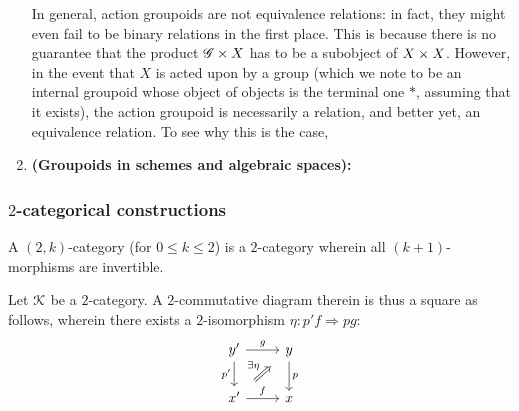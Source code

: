 \begin{example}
\begin{enumerate}
                    In general, action groupoids are not equivalence relations: in fact, they might even fail to be binary relations in the first place. This is because there is no guarantee that the product $\scrG \x X$ has to be a subobject of $X \x X$. However, in the event that $X$ is acted upon by a group (which we note to be an internal groupoid whose object of objects is the terminal one $*$, assuming that it exists), the action groupoid is necessarily a relation, and better yet, an equivalence relation. To see why this is the case, 
                    \item \textbf{(Groupoids in schemes and algebraic spaces):} 
                \end{enumerate}
            \end{example}
        
        \subsubsection{\texorpdfstring{$2$}{}-categorical constructions}
            \begin{definition} \label{def: 2_categories_and_2_functors}
                
            \end{definition}
            \begin{definition}[$(2, k)$-categories] \label{def: (2, k)_categories} 
                A $(2, k)$-category (for $0 \leq k \leq 2$) is a $2$-category wherein all $(k + 1)$-morphisms are invertible.
            \end{definition}
            
            \begin{definition} \label{def: 2_commutative_diagrams}
                Let $\mathcal{K}$ be a $2$-category. A $2$-commutative diagram therein is thus a square as follows, wherein there exists a $2$-isomorphism $\eta: p'f \Rightarrow pg$:
                    $$
                        \begin{tikzcd}
                        	{y'} & y \\
                        	{x'} & x
                        	\arrow["{p'}"', from=1-1, to=2-1]
                        	\arrow["f", from=2-1, to=2-2]
                        	\arrow["g", from=1-1, to=1-2]
                        	\arrow["p", from=1-2, to=2-2]
                        	\arrow["\exists \eta", shorten <=8pt, shorten >=8pt, Rightarrow, from=2-1, to=1-2]
                        \end{tikzcd}
                    $$
            \end{definition}
            
